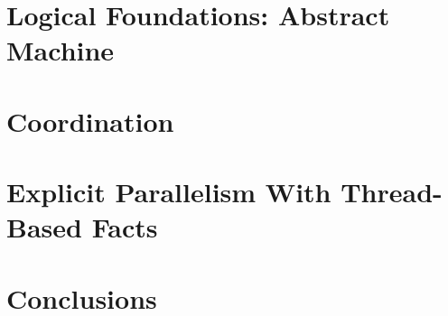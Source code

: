 \documentclass[12pt]{cmuthesis}
\theoremstyle{indented}
\begin{document}
\chapter{Logical Foundations: Abstract Machine}


\chapter{Coordination}\label{chapter:coordination}


\chapter{Explicit Parallelism With Thread-Based Facts}


\chapter{Conclusions}


\appendix


\backmatter


\renewcommand{\bibsection}{\chapter{\bibname}}

\end{document}

